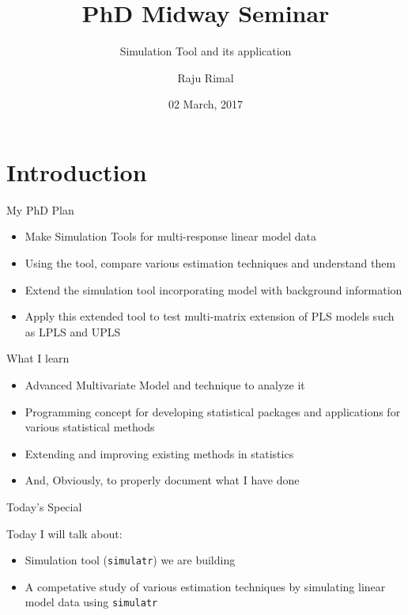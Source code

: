 \documentclass[ignorenonframetext,]{beamer}
\title{PhD Midway Seminar}
\subtitle{Simulation Tool and its application}
\author{Raju Rimal}
\institute{\textbf{Supervisors}\\
Solve Sæbø, Tryge Almøy}
\date{02 March, 2017}
\providecommand{\tightlist}{%
  \setlength{\itemsep}{0pt}\setlength{\parskip}{0pt}}
\begin{document}
\frame{\titlepage}

\section{Introduction}\label{introduction}

\begin{frame}{My PhD Plan}

\hypertarget{left}{}

\hypertarget{right}{}
\begin{itemize}[<+->]
\tightlist
\item
  Make {Simulation Tools} for multi-response linear model data
\item
  Using the tool, compare various {estimation techniques} and
  {understand} them
\item
  {Extend} the simulation tool incorporating model with {background
  information}
\item
  Apply this extended tool to {test multi-matrix extension of PLS}
  models such as LPLS and UPLS
\end{itemize}

\end{frame}

\begin{frame}{What I learn}

\begin{itemize}[<+->]
\tightlist
\item
  Advanced Multivariate Model and technique to analyze it
\item
  Programming concept for developing statistical packages and
  applications for various statistical methods
\item
  Extending and improving existing methods in statistics
\item
  And, Obviously, to properly document what I have done
\end{itemize}

\end{frame}

\begin{frame}[fragile]{Today's Special}

Today I will talk about:

\begin{itemize}[<+->]
\tightlist
\item
  Simulation tool ({\texttt{simulatr}}) we are building
\item
  A {competative study} of various estimation techniques by simulating
  linear model data using \texttt{simulatr}
\end{itemize}

\end{frame}
\end{document}
